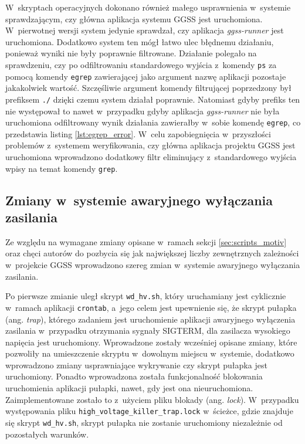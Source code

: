 W~skryptach operacyjnych dokonano również małego usprawnienia w~systemie sprawdzającym, czy główna aplikacja systemu GGSS jest uruchomiona. W~pierwotnej wersji system jedynie sprawdzał, czy aplikacja \emph{ggss-runner} jest uruchomiona. Dodatkowo system ten mógł łatwo ulec błędnemu działaniu, ponieważ wyniki nie były poprawnie filtrowane. Działanie polegało na sprawdzeniu, czy po odfiltrowaniu standardowego wyjścia z~komendy \lstinline{ps} za pomocą komendy \lstinline{egrep} zawierającej jako argument nazwę aplikacji pozostaje jakakolwiek wartość. Szczęśliwie argument komendy filtrującej poprzedzony był prefiksem \lstinline{./} dzięki czemu system działał poprawnie. Natomiast gdyby prefiks ten nie występował to nawet w~przypadku gdyby aplikacja \emph{ggss-runner} nie była uruchomiona odfiltrowany wynik działania zawierałby w~sobie komendę \lstinline{egrep}, co przedstawia listing \ref{lst:egrep_error}. W~celu zapobiegnięcia w~przyszłości problemów z~systemem weryfikowania, czy główna aplikacja projektu GGSS jest uruchomiona wprowadzono dodatkowy filtr eliminujący z~standardowego wyjścia wpisy na temat komendy \lstinline{grep}.



\subsection{Zmiany w~systemie awaryjnego wyłączania zasilania}
Ze względu na wymagane zmiany opisane w~ramach sekcji \ref{sec:scripts_motiv} oraz chęci autorów do pozbycia się jak największej liczby zewnętrznych zależności w~projekcie GGSS wprowadzono szereg zmian w~systemie awaryjnego wyłączania zasilania.

Po pierwsze zmianie uległ skrypt \lstinline{wd_hv.sh}, który uruchamiany jest cyklicznie w~ramach aplikacji \lstinline{crontab}, a~jego celem jest upewnienie się, że skrypt pułapka (ang. \emph{trap}), którego zadaniem jest uruchomienie aplikacji awaryjnego wyłączenia zasilania w~przypadku otrzymania sygnały SIGTERM, dla zasilacza wysokiego napięcia jest uruchomiony. Wprowadzone zostały wcześniej opisane zmiany, które pozwoliły na umieszczenie skryptu w~dowolnym miejscu w~systemie, dodatkowo wprowadzono zmiany usprawniające wykrywanie czy skrypt pułapka jest uruchomiony. Ponadto wprowadzona została funkcjonalność blokowania uruchomienia aplikacji pułapki, nawet, gdy jest ona nieuruchomiona. Zaimplementowane zostało to z~użyciem pliku blokady (ang. \emph{lock}). W~przypadku występowania pliku \lstinline{high_voltage_killer_trap.lock} w~ścieżce, gdzie znajduje się skrypt \lstinline{wd_hv.sh}, skrypt pułapka nie zostanie uruchomiony niezależnie od pozostałych warunków.

